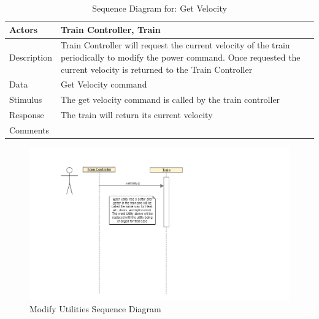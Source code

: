 \documentclass[]{article}
\begin{document}
\begin{table}[H]
	\centering
	\caption{Sequence Diagram for: Get Velocity}
	\begin{tabular}{|l|l|}
		\hline
		Actors & \parbox[t]{10cm}{Train Controller, Train} \\ \hline
		Description & \parbox[t]{10cm}{Train Controller will request the current velocity of the train periodically to modify the power command. Once requested the current velocity is returned to the Train Controller} \\ \hline
		Data &  \parbox[t]{10cm}{Get Velocity command  } \\ \hline
		Stimulus &  \parbox[t]{10cm}{The get velocity command is called by the train controller} \\ \hline
		Response & \parbox[t]{10cm}{The train will return its current velocity}\\ \hline
		Comments & \parbox[t]{10cm}{ }  \\ \hline
	\end{tabular}
\end{table}

\begin{figure}[H]
	\centering
	\includegraphics[scale=.5]{train_model_sqd_modify_utlilties.png}
	\caption{Modify Utilities Sequence Diagram}
\end{figure}
\end{document}
